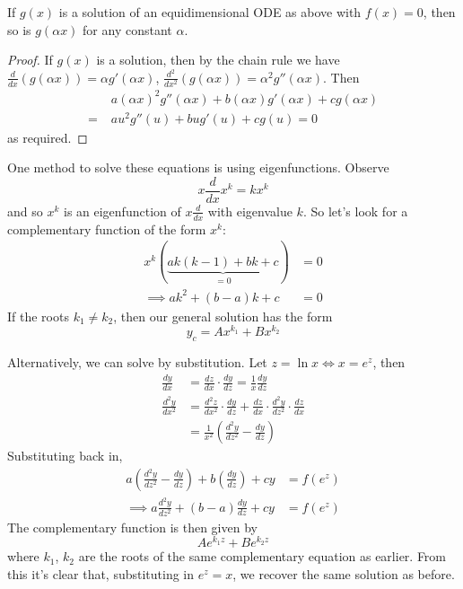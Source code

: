 \documentclass{../template/note}
\begin{document}
    \begin{proposition}
        If \(g(x)\) is a solution of an equidimensional ODE as above with \(f(x) = 0\), then so is \(g(\alpha x)\) for any constant \(\alpha\).
    \end{proposition}
    
    \begin{proof}
        If \(g(x)\) is a solution, then by the chain rule we have \(\frac{d}{dx}(g(\alpha x)) = \alpha g'(\alpha x)\), \(\frac{d^2}{dx^2}(g(\alpha x)) = \alpha^2 g''(\alpha x)\). Then
        \begin{align*}
            &\; a(\alpha x)^2 g''(\alpha x) + b(\alpha x)g'(\alpha x) + cg(\alpha x) \\
            =& \; au^2g''(u) + bug'(u) + cg(u) = 0
        \end{align*}
        as required.
    \end{proof}
    
    One method to solve these equations is using eigenfunctions. Observe
    \[
        x \frac{d}{dx} x^k = kx^k
    \]
    and so \(x^k\) is an eigenfunction of \(x \frac{d}{dx}\) with eigenvalue \(k\). So let's look for a complementary function of the form \(x^k\):
    \begin{align*}
        x^k(\underbrace{ak(k-1) + bk + c}_{=0}) &= 0 \\
        \implies ak^2 + (b-a)k + c &= 0
    \end{align*}
    If the roots \(k_1 \neq k_2\), then our general solution has the form
    \[
        y_c = Ax^{k_1} + Bx^{k_2}
    \]

    Alternatively, we can solve by substitution. Let \(z = \ln x \iff x = e^z\), then
    \begin{align*}
        \frac{dy}{dx} &= \frac{dz}{dx} \cdot \frac{dy}{dz} = \frac{1}{x} \frac{dy}{dz} \\
        \frac{d^2y}{dx^2} &= \frac{d^2z}{dx^2} \cdot \frac{dy}{dz} + \frac{dz}{dx} \cdot \frac{d^2y}{dz^2} \cdot \frac{dz}{dx} \\
        &= \frac{1}{x^2} \left(\frac{d^2y}{dz^2}-\frac{dy}{dz}\right)
    \end{align*}
    Substituting back in,
    \begin{align*}
        a\left(\frac{d^2y}{dz^2}-\frac{dy}{dz}\right) + b\left(\frac{dy}{dz}\right) + cy &= f(e^z) \\
        \implies a \frac{d^2y}{dz^2} + (b-a) \frac{dy}{dz} + cy &= f(e^z)
    \end{align*}
    The complementary function is then given by
    \[  
        Ae^{k_1z} + Be^{k_2z}
    \]
    where \(k_1\), \(k_2\) are the roots of the same complementary equation as earlier. From this it's clear that, substituting in \(e^z = x\), we recover the same solution as before.  
\end{document}
